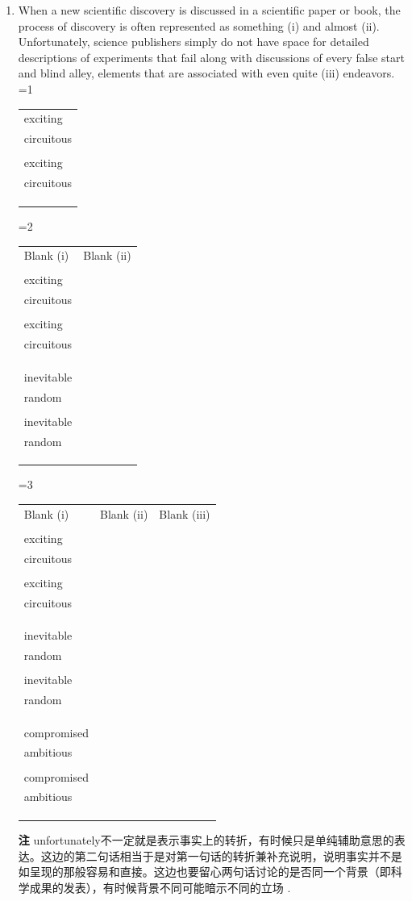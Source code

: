 \documentclass[11pt,space]{ctexart}
\newcommand{\note}[1]{{\heiti\textbf{注\hspace{1em}}}#1.}
\newcommand{\choices}[5]{%
    \ifx\relax#4\relax %
        \begin{tabular}{|>{\centering\arraybackslash}m{0.7\linewidth}|}
        \hline
        #1 \\ 
        \hline
        #2 \\ 
        \hline
        #3 \\
        \hline 
        \end{tabular}
    \else %
        \begin{tabular}{|>{\centering\arraybackslash}m{0.4\linewidth}|}
        \hline
        #1 \\ 
        \hline
        #2 \\ 
        \hline
        #3 \\
        \hline 
        #4 \\ 
        \hline
        #5 \\
        \hline 
        \end{tabular}
    \fi
}
\newcommand{\multiblank}[4]{%
    \ifnum#1=1
        \begin{center}
            \begin{tabularx}{0.4\textwidth}{*{1}{>{\centering\arraybackslash}X}}
            {#2}
            \end{tabularx}
        \end{center}
    \else
        \ifnum#1=2 %
            \begin{center}
                \begin{tabularx}{0.4\textwidth}{*{2}{>{\centering\arraybackslash}X}}
                Blank (i) & Blank (ii) \\
                {#2} & {#3}
                \end{tabularx}
            \end{center}
        \else %
            \ifnum#1=3
                \begin{center}
                    \begin{tabularx}{0.4\textwidth}{*{3}{>{\centering\arraybackslash}X}}
                    Blank (i) & Blank (ii) & Blank (iii) \\
                    {#2} & {#3} & {#4}
                    \end{tabularx}
                \end{center}
            \fi
        \fi
    \fi
}
\begin{document}
\begin{enumerate}
\item When a new scientific discovery is discussed in a scientific paper or book, the process of discovery is often represented as something (i)\blank{} and almost (ii)\blank{}. Unfortunately, science publishers simply do not have space for detailed descriptions of experiments that fail along with discussions of every false start and blind alley, elements that are associated with even quite (iii)\blank{} endeavors.
\multiblank{3}{\choices{straightforward}{exciting}{circuitous}{}{}}{\choices{redundant}{inevitable}{random}{}{}}{\choices{successful}{compromised}{ambitious}{}{}}
\note{
unfortunately不一定就是表示事实上的转折，有时候只是单纯辅助意思的表达。这边的第二句话相当于是对第一句话的转折兼补充说明，说明事实并不是如呈现的那般容易和直接。这边也要留心两句话讨论的是否同一个背景（即科学成果的发表），有时候背景不同可能暗示不同的立场
}

\end{enumerate}

\newpage
\end{document}
